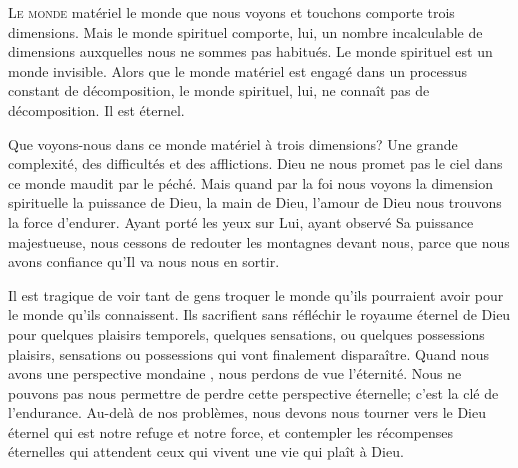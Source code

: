 



\lettrine{L}{e monde} matériel \ocadr le monde que nous voyons
 et touchons \fcadr{} comporte trois dimensions.
 Mais le monde spirituel comporte, lui, un nombre incalculable
 de dimensions auxquelles
 nous ne sommes pas habitués. Le monde spirituel est un monde invisible.
 Alors que le monde matériel est engagé dans un processus
 constant de décomposition, le monde spirituel, lui, ne connaît pas
 de décomposition. Il est éternel.


Que voyons-nous dans ce monde matériel à trois dimensions?
 Une grande complexité, des difficultés et des afflictions.
 Dieu ne nous promet pas le ciel dans ce monde maudit par le péché.
 Mais quand par la foi nous voyons la dimension spirituelle
 \ocadr la puissance de Dieu, la main de Dieu, l'amour de Dieu \fcadr{}
 nous trouvons la force d'endurer. Ayant porté les yeux sur Lui,
 ayant observé Sa puissance majestueuse, nous cessons de redouter
 les montagnes devant nous, parce que nous avons confiance
 qu'Il va nous nous en sortir.

Il est tragique de voir tant de gens troquer le monde
 qu'ils pourraient avoir pour le monde qu'ils connaissent.
 Ils sacrifient sans réfléchir le royaume éternel de Dieu
 pour quelques plaisirs temporels, quelques sensations, ou quelques possessions
 \ocadr plaisirs, sensations ou possessions qui vont finalement disparaître.
 Quand nous avons une perspective mondaine ,
 nous perdons de vue l'éternité. Nous ne pouvons pas nous permettre de perdre
 cette perspective éternelle; c'est la clé de l'endurance.
 Au-delà de nos problèmes, nous devons nous tourner vers le Dieu éternel
 qui est notre refuge et notre force, et contempler les récompenses
 éternelles qui attendent ceux qui vivent une vie qui plaît à Dieu.

\dvrule



